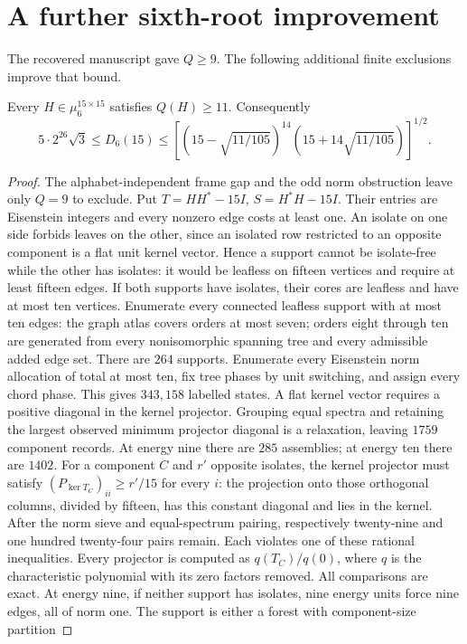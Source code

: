 \section{A further sixth-root improvement}\label{app:sixth-improvement}
The recovered manuscript gave $Q\ge9$. The following additional finite exclusions improve that bound.
\begin{theorem}\label{thm:sixth-eleven}
Every $H\in\mu_6^{15\times15}$ satisfies $Q(H)\ge11$. Consequently
\[5\cdot2^{26}\sqrt3\le D_6(15)\le
 \left[(15-\sqrt{11/105})^{14}(15+14\sqrt{11/105})\right]^{1/2}.\]
\end{theorem}
\begin{proof}
The alphabet-independent frame gap and the odd norm obstruction leave only $Q=9$ to exclude. Put $T=HH^*-15I$, $S=H^*H-15I$. Their entries are Eisenstein integers and every nonzero edge costs at least one. An isolate on one side forbids leaves on the other, since an isolated row restricted to an opposite component is a flat unit kernel vector. Hence a support cannot be isolate-free while the other has isolates: it would be leafless on fifteen vertices and require at least fifteen edges.
If both supports have isolates, their cores are leafless and have at most ten vertices. Enumerate every connected leafless support with at most ten edges: the graph atlas covers orders at most seven; orders eight through ten are generated from every nonisomorphic spanning tree and every admissible added edge set. There are $264$ supports. Enumerate every Eisenstein norm allocation of total at most ten, fix tree phases by unit switching, and assign every chord phase. This gives $343{,}158$ labelled states. A flat kernel vector requires a positive diagonal in the kernel projector. Grouping equal spectra and retaining the largest observed minimum projector diagonal is a relaxation, leaving $1759$ component records. At energy nine there are $285$ assemblies; at energy ten there are $1402$.
For a component $C$ and $r'$ opposite isolates, the kernel projector must satisfy $(P_{\ker T_C})_{ii}\ge r'/15$ for every $i$: the projection onto those orthogonal columns, divided by fifteen, has this constant diagonal and lies in the kernel. After the norm sieve and equal-spectrum pairing, respectively twenty-nine and one hundred twenty-four pairs remain. Each violates one of these rational inequalities. Every projector is computed as $q(T_C)/q(0)$, where $q$ is the characteristic polynomial with its zero factors removed. All comparisons are exact.
At energy nine, if neither support has isolates, nine energy units force nine edges, all of norm one. The support is either a forest with component-size partition

\end{proof}
